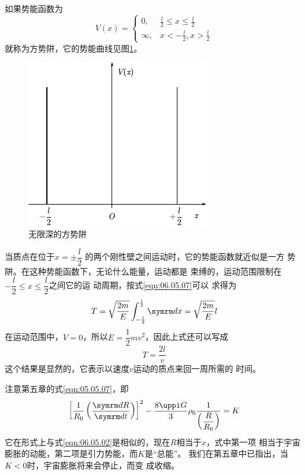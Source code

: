 \example 如果势能函数为
\begin{equation*}
    V ( x ) = \begin{cases}
        0,&  \frac { l }{ 2 } \leqslant x \leqslant \frac { l } { 2 } \\
        \infty,&  x < - \frac { l } { 2 }, x > \frac { l } { 2 }
    \end{cases}
\end{equation*}
就称为方势阱，它的势能曲线见图\ref{fig:06.13}。

\begin{figure}
    \vspace{-1.56em}
    \centering
    \includegraphics{figure/fig06.13}
    \caption{无限深的方势阱}
    \label{fig:06.13}
\end{figure}
当质点在位于$ x = \pm \dfrac { l } { 2 } $
的两个刚性壁之间运动时，它的势能函数就近似是一方
势阱。在这种势能函数下，无论什么能量，运动都是
束缚的，运动范围限制在
$ - \dfrac { l } { 2 } \leqslant x \leqslant \dfrac { l } { 2 }   $之间它的运
动周期，按式\eqref{eqn:06.05.07}可以
求得为
\begin{equation*}
    T = \sqrt { \frac { 2 m } { E } } \int _ { - \frac { l } { 2 } } ^ { \frac { l } { 2 } } \dif x = \sqrt { \frac { 2 m } { E } } l
\end{equation*}
在运动范围中，$ V = 0   $，所以$ E = \dfrac { 1 } { 2 } m v ^ { 2 }   $，因此上式还可以写成
\begin{equation*}
    T = \frac { 2 l } { v }
\end{equation*}
这个结果是显然的，它表示以速度$ v $运动的质点来回一周所需的
时间。

\example 注意第五章的式\eqref{eqn:05.05.07}，即
\begin{equation}\label{eqn:06.05.08}
    \left[ \frac { 1 } { R _ { 0 } } \left( \frac { \dif R } { \dif t } \right) \right] ^ { 2 }- \frac { 8 \uppi G } { 3 } \rho _ 0 \frac { 1 } { \left( \dfrac { R } { R _ { 0 } } \right) } = K
\end{equation}
它在形式上与式\eqref{eqn:06.05.02}是相似的，现在$ R $相当于$ x $，式中第一项
相当于宇宙膨胀的动能，第二项是引力势能，而$ K $是“总能”。
我们在第五章中已指出，当$  K < 0   $时，宇宙膨胀将来会停止，而变
成收缩。

